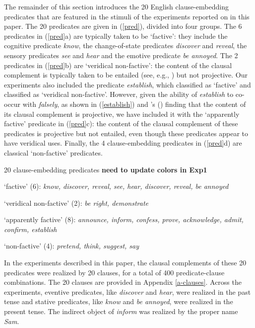 \documentclass[11pt,fleqn]{article}
\newcommand{\6}{\mbox{$[\hspace*{-.6mm}[$}}
\newcommand{\9}{\mbox{$]\hspace*{-.6mm}]$}}
\newcommand{\citetpos}[1]{\citeauthor{#1}'s (\citeyear{#1})}
\begin{document}
The remainder of this section introduces the 20 English clause-embedding predicates that are featured in the stimuli of the experiments reported on in this paper. The 20 predicates are given in (\ref{pred}), divided into four groups. The 6 predicates in (\ref{pred}a) are typically taken to be `factive': they  include the cognitive predicate {\em know}, the change-of-state predicates {\em discover} and {\em reveal}, the sensory predicates {\em see} and {\em hear} and the emotive predicate {\em be annoyed}. The 2 predicates in (\ref{pred}b) are `veridical non-factive': the content of the clausal complement is typically taken to be entailed (see, e.g., \citealt{anand-hacquard2014}) but not projective. Our experiments also included the predicate {\em establish}, which \citet{wyse} classified as `factive' and \citet{swanson2012} classified as `veridical non-factive'. However, given the ability of {\em establish} to co-occur with {\em falsely}, as shown in (\ref{establish}) and \citetpos{tbd-variability} finding that the content of its clausal complement is projective, we have included it with the `apparently factive' predicate in (\ref{pred}c): the content of the clausal complement of these predicates is projective but not entailed, even though these predicates appear to have veridical uses. Finally, the 4 clause-embedding predicates in (\ref{pred}d) are classical `non-factive' predicates.

\begin{exe}
\ex\label{pred} 20 clause-embedding predicates  \hfill {\bf need to update colors in Exp1}

\begin{xlist}

\ex `factive' (6): {\em know, discover, reveal, see, hear, discover, reveal, be annoyed}

\ex `veridical non-factive' (2): {\em be right, demonstrate}

\ex `apparently factive' (8): {\em announce, inform, confess, prove, acknowledge, admit, confirm, establish}

\ex `non-factive' (4): {\em pretend, think, suggest, say}

\end{xlist}

\end{exe}
In the experiments described in this paper, the clausal complements of these 20 predicates were realized by 20 clauses, for a total of 400 predicate-clause combinations. The 20 clauses are provided in Appendix \ref{a-clauses}. Across the experiments, eventive predicates, like {\em discover} and {\em hear}, were realized in the past tense and stative predicates, like {\em know} and {\em be annoyed}, were realized in the present tense. The indirect object of {\em inform} was realized by the proper name {\em Sam}.
\end{document}
